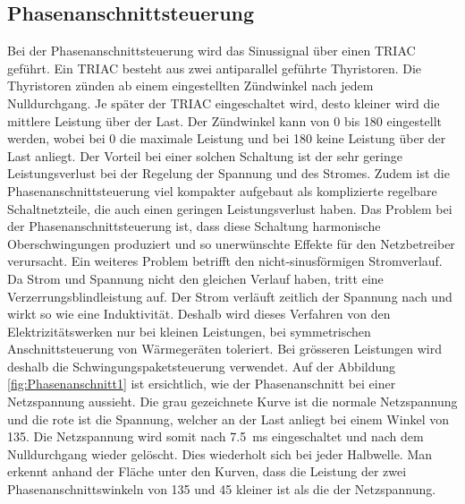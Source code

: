 \subsection{Phasenanschnittsteuerung}\label{sec:Phasenanschnittsteuerung}
Bei der Phasenanschnittsteuerung wird das Sinussignal über einen TRIAC geführt. Ein TRIAC besteht aus zwei antiparallel geführte Thyristoren. Die Thyristoren zünden ab einem eingestellten Zündwinkel nach jedem Nulldurchgang. Je später der TRIAC eingeschaltet wird, desto kleiner wird die mittlere Leistung über der Last. Der Zündwinkel kann von 0\textdegree \hspace{0.02cm} bis 180\textdegree \hspace{0.02cm} eingestellt werden, wobei bei 0\textdegree \hspace{0.02cm} die maximale Leistung und bei 180\textdegree \hspace{0.02cm} keine Leistung über der Last anliegt. Der Vorteil bei einer solchen Schaltung ist der sehr geringe Leistungsverlust bei der Regelung der Spannung und des Stromes. Zudem ist die Phasenanschnittsteuerung viel kompakter aufgebaut als komplizierte regelbare Schaltnetzteile, die auch einen geringen Leistungsverlust haben.
Das Problem bei der Phasenanschnittsteuerung ist, dass diese Schaltung harmonische Oberschwingungen produziert und so unerwünschte Effekte für den Netzbetreiber verursacht. Ein weiteres Problem betrifft den nicht-sinusförmigen Stromverlauf. Da Strom und Spannung nicht den gleichen Verlauf haben, tritt eine Verzerrungsblindleistung auf. Der Strom verläuft zeitlich der Spannung nach und wirkt so wie eine Induktivität. Deshalb wird dieses Verfahren von den Elektrizitätswerken nur bei kleinen Leistungen, bei symmetrischen Anschnittsteuerung von Wärmegeräten toleriert. Bei grösseren Leistungen wird deshalb die Schwingungspaketsteuerung verwendet. Auf der Abbildung \ref{fig:Phasenanschnitt1} ist ersichtlich, wie der Phasenanschnitt bei einer Netzspannung aussieht. Die grau gezeichnete Kurve ist die normale Netzspannung und die rote ist die Spannung, welcher an der Last anliegt bei einem Winkel von 135\textdegree\hspace{0.02cm}. Die Netzspannung wird somit nach \SI{7.5}{ms} eingeschaltet und nach dem Nulldurchgang wieder gelöscht. Dies wiederholt sich bei jeder Halbwelle. Man erkennt anhand der Fläche unter den Kurven, dass die Leistung der zwei Phasenanschnittswinkeln von 135\textdegree\hspace{0.02cm} und 45\textdegree\hspace{0.02cm} kleiner ist als die der Netzspannung. 

